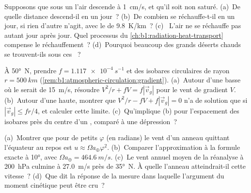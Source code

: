 \begin{exercise}[$\star\star$]\label{exo:b1:atmospheric-circulation:9}
Supposons que sous un  l'air descende à \qty{1}{cm/s}, et qu'il soit
non saturé. (a)~De quelle distance descend-il en un jour~? (b)~De combien se réchauffe-t-il en un jour,
si rien d'autre n'agit, avec le  de \qty{9.8}{K/km}~? (c)~
L'air ne se réchauffe pas autant jour après jour. Quel processus du
\cref{ch:b1:radiation-heat-transport} compense le réchauffement~? (d)~Pourquoi beaucoup des
grands déserts chauds se trouvent-ils sous ces ~?
\end{exercise}

\begin{exercise}[$\star\star\star$]\label{exo:b1:atmospheric-circulation:10}
À \ang{50}~N, prendre $f = \qty{1.117e-4}{s^{-1}}$ et des isobares circulaires de rayon
$r = \qty{500}{km}$ (\cref{rem:b1:atmospheric-circulation:gradient}). (a)~Autour d'une
basse où le  serait de \qty{15}{m/s}, résoudre $V^2/r + fV =
f|\vec v_g|$ pour le vent de gradient $V$. (b)~Autour d'une haute, montrer que $V^2/r - fV + f
|\vec v_g| = 0$ n'a de solution que si $|\vec v_g| \leq fr/4$, et calculer cette limite.
(c)~Qu'implique (b) pour l'espacement des isobares près du centre d'un
, comparé à une dépression~?
\end{exercise}

\begin{exercise}[$\star\star\star$]\label{exo:b1:atmospheric-circulation:11}
(a)~Montrer que pour de petits $\varphi$ (en radians) le vent d'un anneau quittant l'équateur
au repos est $u \approx \Omega a_\oplus\varphi^2$. (b)~Comparer l'approximation à
la formule exacte à \ang{10}, avec $\Omega a_\oplus = \qty{464.6}{m/s}$. (c)~Le
vent annuel moyen de la réanalyse à \qty{200}{hPa} culmine à \qty{27.0}{m/s} près de
\ang{35}~N. À quelle  l'anneau atteindrait-il cette vitesse~? (d)~Que dit la
réponse de la mesure dans laquelle l'argument du moment cinétique peut être cru~?
\end{exercise}

